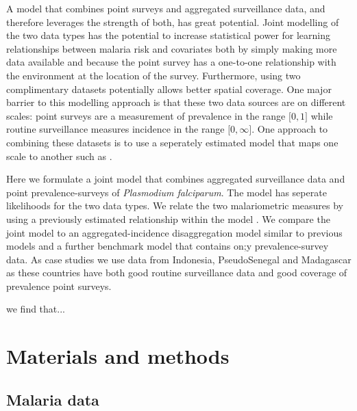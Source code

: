 \documentclass[10pt,letterpaper]{article}
\begin{document}
A model that combines point surveys and aggregated surveillance data, and therefore leverages the strength of both, has great potential.
Joint modelling of the two data types has the potential to increase statistical power for learning relationships between malaria risk and covariates both by simply making more data available and because the point survey has a one-to-one relationship with the environment at the location of the survey.
Furthermore, using two complimentary datasets potentially allows better spatial coverage. 
One major barrier to this modelling approach is that these two data sources are on different scales: point surveys are a measurement of prevalence in the range $\lbrack 0, 1\rbrack$ while routine surveillance measures incidence in the range $\lbrack 0, \infty\rbrack$.
One approach to combining these datasets is to use a seperately estimated model that maps one scale to another such as \cite{cameron2015defining}.


Here we formulate a joint model that combines aggregated surveillance data and point prevalence-surveys of \emph{Plasmodium falciparum}.
The model has seperate likelihoods for the two data types.
We relate the two malariometric measures by using a previously estimated relationship within the model \cite{cameron2015defining}.
We compare the joint model to an aggregated-incidence disaggregation model similar to previous models \cite{sturrock2014fine, wilson2017pointless} and a further benchmark model that contains on;y prevalence-survey data.
As case studies we use data from Indonesia, PseudoSenegal and Madagascar as these countries have both good routine surveillance data and good coverage of prevalence point surveys.


we find that...


\section*{Materials and methods}


\subsection*{Malaria data}
\end{document}
